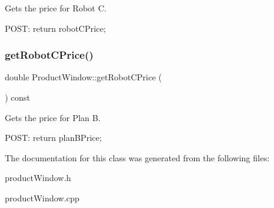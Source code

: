 Gets the price for Robot C. 

P\+O\+ST\+: return robot\+C\+Price; \mbox{\label{class_product_window_a66832cd0d36260949da84db6afa21a92}} 
\subsubsection{\texorpdfstring{get\+Robot\+C\+Price()}{getRobotCPrice()}}
{\footnotesize\ttfamily double Product\+Window\+::get\+Robot\+C\+Price (\begin{DoxyParamCaption}{ }\end{DoxyParamCaption}) const}



Gets the price for Plan B. 

P\+O\+ST\+: return plan\+B\+Price; 

The documentation for this class was generated from the following files\+:\begin{DoxyCompactItemize}
\item 
product\+Window.\+h\item 
product\+Window.\+cpp\end{DoxyCompactItemize}
